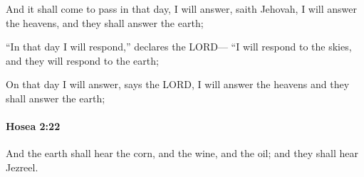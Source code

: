 			\begin{versebox}
					\item[BHS] 
					\item[LXX] 
					\item[ASV] And it shall come to pass in that day, I will answer, saith Jehovah, I will answer the heavens, and they shall answer the earth;
					\item[NIV] “In that day I will respond,” declares the LORD— “I will respond to the skies, and they will respond to the earth;
					\item[NRSV] On that day I will answer, says the LORD, I will answer the heavens and they shall answer the earth;
			\end{versebox}

		\paragraph{Hosea 2:22} %
			\label{HOSEA-2-22}

			And the earth shall hear the corn, and the wine, and the oil; and they shall hear Jezreel.

